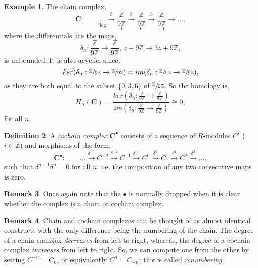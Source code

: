 \documentclass[11.5pt, twoside, a4paper, titlepage]{report}
\providecommand{\bb}[1]{\mathbb{#1}}
\theoremstyle{definition}
\newtheorem{mydef}{Definition}[section]
\newtheorem{rem}[mydef]{Remark}
\newtheorem{eg}[mydef]{Example}
\theoremstyle{plain}
\begin{document}
\begin{eg}
The chain complex,
\begin{equation*}
\mathbf{C}: \qquad \underset{\text{deg}}{\underset{}{\dots}} \xrightarrow{3}\underset{1}{\frac{\bb{Z}}{9\bb{Z}}} \xrightarrow{3}\underset{0}{\frac{\bb{Z}}{9\bb{Z}}} \xrightarrow{3}\underset{-1}{\frac{\bb{Z}}{9\bb{Z}}} \xrightarrow{} \dots,
\end{equation*}
where the differentials are the maps,
\begin{equation*}
\delta_n:\frac{\bb{Z}}{9\bb{Z}}\xrightarrow{}\frac{\bb{Z}}{9\bb{Z}}\text{, } z+9\bb{Z}\mapsto 3z+9\bb{Z},
\end{equation*}
is unbounded. It is also acyclic, since,
\begin{equation*}
ker(\delta_n:\sfrac{\bb{Z}}{9\bb{Z}}\xrightarrow{}\sfrac{\bb{Z}}{9\bb{Z}})=im(\delta_n:\sfrac{\bb{Z}}{9\bb{Z}}\xrightarrow{}\sfrac{\bb{Z}}{9\bb{Z}}),
\end{equation*}
as they are both equal to the subset $\{0,3,6\}$ of $\sfrac{\bb{Z}}{9\bb{Z}}$.
So the homology is,
\begin{equation*}
H_n(\mathbf{C})=\frac{ker(\delta_n:\frac{\bb{Z}}{9\bb{Z}}\xrightarrow{}\frac{\bb{Z}}{9\bb{Z}})}{im(\delta_n:\frac{\bb{Z}}{9\bb{Z}}\xrightarrow{}\frac{\bb{Z}}{9\bb{Z}})} \cong 0, 
\end{equation*}
for all $n$.
\end{eg}

\begin{mydef}
A \emph{cochain complex} $\mathbf{C}^{\bullet}$ consists of a sequence of $R$-modules $C^i$ ($i \in \mathbb{Z}$) and morphisms of the form,
\begin{equation*}
\mathbf{C^{\bullet}}: \qquad \dots \xrightarrow{\delta^{-3}} C^{-2} \xrightarrow{\delta^{-2}} C^{-1} \xrightarrow{\delta^{-1 }} C^0 \xrightarrow{\delta^0} C^{1} \xrightarrow{\delta^{1}} C^{2} \xrightarrow{\delta^{2}} \dots,
\end{equation*}
such that $\delta^{n-1}\delta^{n}=0$ for all $n$, i.e. the composition of any two consecutive maps is zero.
\end{mydef}

\begin{rem}
Once again note that the $\bullet$ is normally dropped when it is clear whether the complex is a chain or cochain complex.
\end{rem}

\begin{rem}
Chain and cochain complexes can be thought of as almost identical constructs with the only difference being the numbering of the chain. The degree of a chain complex \emph{decreases} from left to right, whereas, the degree of a cochain complex \emph{increases} from left to right. So, we can compute one from the other by setting $C^{-n}=C_n$, or equivalently $C^n=C_{-n}$; this is called \emph{renumbering}.
\end{rem}
\end{document}
